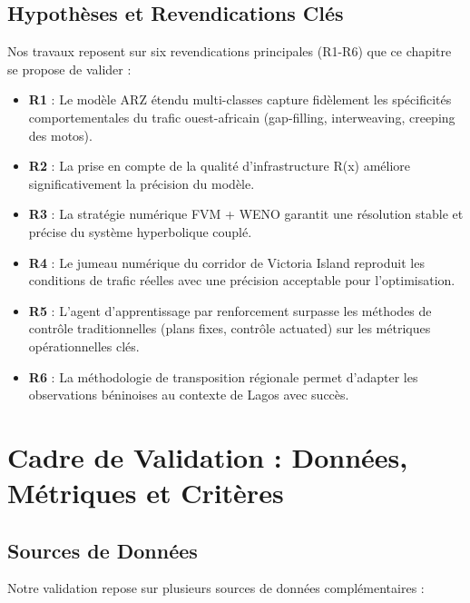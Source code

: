 \subsection{Hypothèses et Revendications Clés}
\label{subsec:hypotheses_revendications}

Nos travaux reposent sur six revendications principales (R1-R6) que ce chapitre se propose de valider :

\begin{itemize}
    \item \textbf{R1} : Le modèle ARZ étendu multi-classes capture fidèlement les spécificités comportementales du trafic ouest-africain (gap-filling, interweaving, creeping des motos).
    \item \textbf{R2} : La prise en compte de la qualité d'infrastructure R(x) améliore significativement la précision du modèle.
    \item \textbf{R3} : La stratégie numérique FVM + WENO garantit une résolution stable et précise du système hyperbolique couplé.
    \item \textbf{R4} : Le jumeau numérique du corridor de Victoria Island reproduit les conditions de trafic réelles avec une précision acceptable pour l'optimisation.
    \item \textbf{R5} : L'agent d'apprentissage par renforcement surpasse les méthodes de contrôle traditionnelles (plans fixes, contrôle actuated) sur les métriques opérationnelles clés.
    \item \textbf{R6} : La méthodologie de transposition régionale permet d'adapter les observations béninoises au contexte de Lagos avec succès.
\end{itemize}


\section{Cadre de Validation : Données, Métriques et Critères}
\label{sec:cadre_validation}

\subsection{Sources de Données}
\label{subsec:sources_donnees}

Notre validation repose sur plusieurs sources de données complémentaires :

